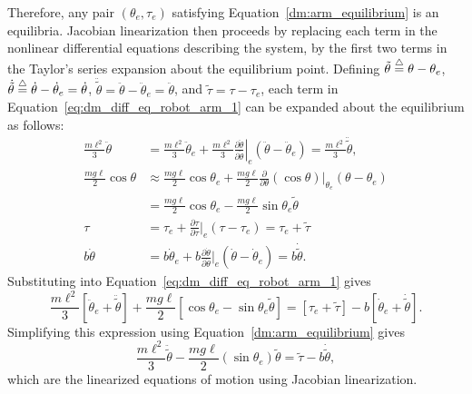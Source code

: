 Therefore, any pair $(\theta_e, \tau_e)$ satisfying Equation~\eqref{dm:arm_equilibrium} is an equilibria.  
Jacobian linearization then proceeds by replacing each term in the nonlinear differential equations describing the system, by the first two terms in the Taylor's series expansion about the equilibrium point.  
Defining $\tilde{\theta}\stackrel{\triangle}{=}\theta-\theta_e$, $\dot{\tilde{\theta}}\stackrel{\triangle}{=}\dot{\theta}-\dot{\theta}_e=\dot{\theta}$, $\ddot{\tilde{\theta}}=\ddot{\theta}-\ddot{\theta}_e=\ddot{\theta}$, and $\tilde{\tau}=\tau-\tau_e$, each term in Equation~\eqref{eq:dm_diff_eq_robot_arm_1} can be expanded about the equilibrium as follows:
\begin{align*}
\frac{m\ell^2}{3}\ddot{\theta} &= \frac{m\ell^2}{3}\ddot{\theta}_e + \frac{m\ell^2}{3}\left.\frac{\partial \ddot{\theta}}{\partial \ddot{\theta}}\right|_e (\ddot{\theta}-\ddot{\theta}_e) = \frac{m\ell^2}{3} \ddot{\tilde{\theta}}, \\
\frac{mg\ell}{2}\cos\theta &\approx \frac{mg\ell}{2} \cos\theta_e + \frac{mg\ell}{2}\frac{\partial}{\partial \theta}
(\cos\theta)\Big|_{\theta_e} 
(\theta-\theta_e) \\
&= \frac{mg\ell}{2}\cos\theta_e - \frac{mg\ell}{2}\sin\theta_e \tilde{\theta} \\
\tau &= \tau_e + \frac{\partial \tau}{\partial \tau}\Big|_e (\tau-\tau_e)
     = \tau_e + \tilde{\tau} \\
b\dot{\theta} &= b\dot{\theta}_e + b\frac{\partial \dot{\theta}}{\partial \dot{\theta}}\Big|_e (\dot{\theta}-\dot{\theta}_e) = b\dot{\tilde{\theta}}.  
\end{align*}
Substituting into Equation~\eqref{eq:dm_diff_eq_robot_arm_1} gives
\[
\frac{m\ell^2}{3}\left[\ddot{\theta}_e + \ddot{\tilde{\theta}}\right] + \frac{mg\ell}{2}\left[\cos\theta_e - \sin\theta_e\tilde{\theta}\right] = \left[\tau_e+\tilde{\tau}\right] - b\left[\dot{\theta}_e +\dot{\tilde{\theta}}\right].
\]
Simplifying this expression using Equation~\eqref{dm:arm_equilibrium} gives
\begin{equation}\label{eq:arm_linearized_eom_jacobian}
\frac{m\ell^2}{3}\ddot{\tilde{\theta}} - \frac{mg\ell}{2}(\sin\theta_e)\tilde{\theta} = \tilde{\tau} - b\dot{\tilde{\theta}},
\end{equation}
which are the linearized equations of motion using Jacobian linearization.

